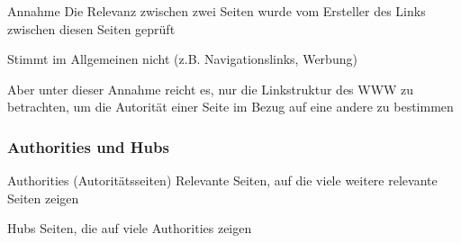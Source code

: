 \documentclass[hyperref={pdfpagelabels=false}]{beamer}
\begin{document}
\begin{frame}[allowframebreaks]

\begin{block}{Annahme}
Die Relevanz zwischen zwei Seiten wurde vom Ersteller des Links zwischen diesen Seiten geprüft
\end{block}

Stimmt im Allgemeinen nicht (z.B. Navigationslinks, Werbung)
\vspace{10pt}

Aber unter dieser Annahme reicht es, nur die Linkstruktur des WWW zu betrachten, um die Autorität einer Seite im Bezug auf eine andere zu bestimmen

\frametitle{Authorities und Hubs}

\framebreak

\begin{block}{Authorities (Autoritätsseiten)}
Relevante Seiten, auf die viele weitere relevante Seiten zeigen
\end{block}

%			
%			
%				
%				
%				
%				

\begin{block}{Hubs}
Seiten, die auf viele Authorities zeigen
\end{block}

\end{frame}
\end{document}
